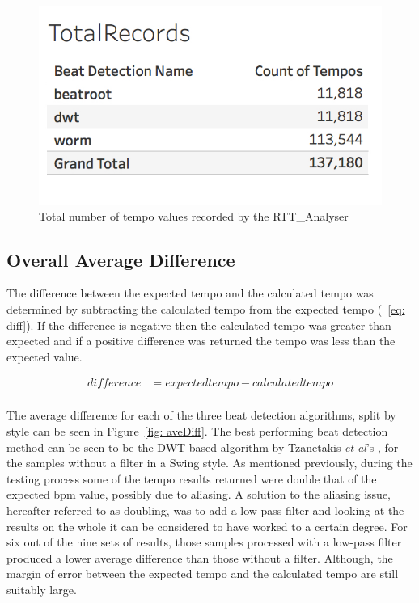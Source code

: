 \documentclass[a4paper, 11pt]{article}
\begin{document}
\begin{figure}[ht]
\centering
\includegraphics[scale=0.3]{totRec.jpg}
\caption{Total number of tempo values recorded by the RTT\_Analyser}
\label{fig: totrec}
\end{figure}

\subsection{Overall Average Difference}
The difference between the expected tempo and the calculated tempo was determined by subtracting the calculated tempo from the expected tempo (~\ref{eq: diff}). If the difference is negative then the calculated tempo was greater than expected and if a positive difference was returned the tempo was less than the expected value.

\begin{equation}\label{eq: diff}
\begin{split}
difference& =expected tempo - calculated tempo\\
\end{split}
\end{equation}

The average difference for each of the three beat detection algorithms, split by style can be seen in Figure~\ref{fig: aveDiff}. The best performing beat detection method can be seen to be the DWT based algorithm by Tzanetakis \textit{et al}'s \cite{tzane1}, for the samples without a filter in a Swing style. As mentioned previously, during the testing process some of the tempo results returned were double that of the expected bpm value, possibly due to aliasing. A solution to the aliasing issue, hereafter referred to as doubling, was to add a low-pass filter and looking at the results on the whole it can be considered to have worked to a certain degree. For six out of the nine sets of results, those samples processed with a low-pass filter produced a lower average difference than those without a filter. Although, the margin of error between the expected tempo and the calculated tempo are still suitably large.\par
\end{document}
